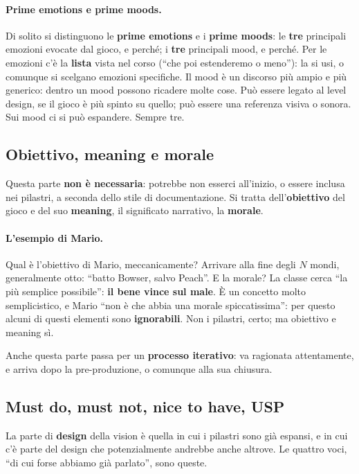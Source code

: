 \paragraph{Prime emotions e prime moods.} Di solito si distinguono le
\textbf{prime emotions} e i \textbf{prime moods}: le \textbf{tre} principali
emozioni evocate dal gioco, e perché; i \textbf{tre} principali mood, e
perché. Per le emozioni c'è la \textbf{lista} vista nel corso (``che poi
estenderemo o meno''): la si usi, o comunque si scelgano emozioni
specifiche. Il mood è un discorso più ampio e più generico: dentro un mood
possono ricadere molte cose. Può essere legato al level design, se il gioco è
più spinto su quello; può essere una referenza visiva o sonora. Sui mood ci
si può espandere. Sempre tre.

\subsection{Obiettivo, meaning e morale}

Questa parte \textbf{non è necessaria}: potrebbe non esserci all'inizio, o
essere inclusa nei pilastri, a seconda dello stile di documentazione. Si
tratta dell'\textbf{obiettivo} del gioco e del suo \textbf{meaning}, il
significato narrativo, la \textbf{morale}.

\paragraph{L'esempio di Mario.} Qual è l'obiettivo di Mario, meccanicamente?
Arrivare alla fine degli $N$ mondi, generalmente otto: ``batto Bowser, salvo
Peach''. E la morale? La classe cerca ``la più semplice possibile'': \textbf{il
bene vince sul male}. È un concetto molto semplicistico, e Mario ``non è che
abbia una morale spiccatissima'': per questo alcuni di questi elementi sono
\textbf{ignorabili}. Non i pilastri, certo; ma obiettivo e meaning sì.

Anche questa parte passa per un \textbf{processo iterativo}: va ragionata
attentamente, e arriva dopo la pre-produzione, o comunque alla sua chiusura.

\subsection{Must do, must not, nice to have, USP}

La parte di \textbf{design} della vision è quella in cui i pilastri sono già
espansi, e in cui c'è parte del design che potenzialmente andrebbe anche
altrove. Le quattro voci, ``di cui forse abbiamo già parlato'', sono queste.

